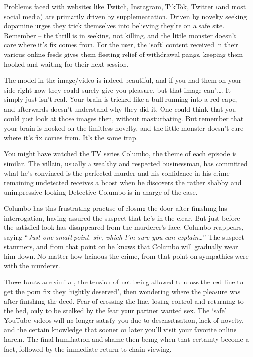 \documentclass[
]{book}
\begin{document}
Problems faced with websites like Twitch, Instagram, TikTok, Twitter (and most social media) are primarily driven by supplementation. Driven by novelty seeking dopamine urges they trick themselves into believing they're on a safe site. Remember -- the thrill is in seeking, not killing, and the little monster doesn't care where it's fix comes from. For the user, the `soft' content received in their various online feeds gives them fleeting relief of withdrawal pangs, keeping them hooked and waiting for their next session.

The model in the image/video is indeed beautiful, and if you had them on your side right now they could surely give you pleasure, but that image can't\ldots{} It simply just isn't real. Your brain is tricked like a bull running into a red cape, and afterwards doesn't understand why they did it. One could think that you could just look at those images then, without masturbating. But remember that your brain is hooked on the limitless novelty, and the little monster doesn't care where it's fix comes from. It's the same trap.

You might have watched the TV series Columbo, the theme of each episode is similar. The villain, usually a wealthy and respected businessman, has committed what he's convinced is the perfected murder and his confidence in his crime remaining undetected receives a boost when he discovers the rather shabby and unimpressive-looking Detective Columbo is in charge of the case.

Columbo has this frustrating practise of closing the door after finishing his interrogation, having assured the suspect that he's in the clear. But just before the satisfied look has disappeared from the murderer's face, Columbo reappears, saying ``\emph{Just one small point, sir, which I'm sure you can explain\ldots{}}'' The suspect stammers, and from that point on he knows that Columbo will gradually wear him down. No matter how heinous the crime, from that point on sympathies were with the murderer.

These bouts are similar, the tension of not being allowed to cross the red line to get the porn fix they `rightly deserved', then wondering where the pleasure was after finishing the deed. Fear of crossing the line, losing control and returning to the bed, only to be stalked by the fear your partner wanted sex. The `safe' YouTube videos will no longer satisfy you due to desensitisation, lack of novelty, and the certain knowledge that sooner or later you'll visit your favorite online harem. The final humiliation and shame then being when that certainty become a fact, followed by the immediate return to chain-viewing.
\end{document}
